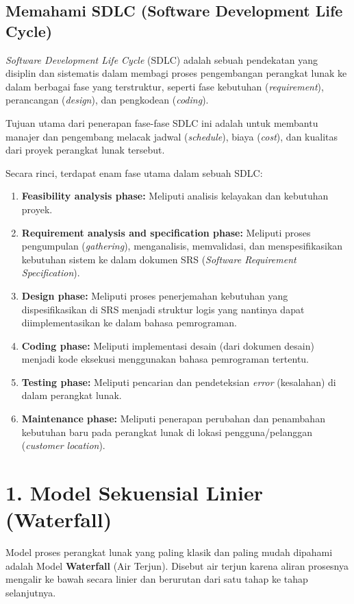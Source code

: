 \documentclass[12pt,a4paper]{article}
\begin{document}
\subsection{Memahami SDLC (Software Development Life Cycle)}
\textit{Software Development Life Cycle} (SDLC) adalah sebuah pendekatan yang disiplin dan sistematis dalam membagi proses pengembangan perangkat lunak ke dalam berbagai fase yang terstruktur, seperti fase kebutuhan (\textit{requirement}), perancangan (\textit{design}), dan pengkodean (\textit{coding}). 

Tujuan utama dari penerapan fase-fase SDLC ini adalah untuk membantu manajer dan pengembang melacak jadwal (\textit{schedule}), biaya (\textit{cost}), dan kualitas dari proyek perangkat lunak tersebut.

Secara rinci, terdapat enam fase utama dalam sebuah SDLC:
\begin{enumerate}
    \item \textbf{Feasibility analysis phase:} Meliputi analisis kelayakan dan kebutuhan proyek.
    \item \textbf{Requirement analysis and specification phase:} Meliputi proses pengumpulan (\textit{gathering}), menganalisis, memvalidasi, dan menspesifikasikan kebutuhan sistem ke dalam dokumen SRS (\textit{Software Requirement Specification}).
    \item \textbf{Design phase:} Meliputi proses penerjemahan kebutuhan yang dispesifikasikan di SRS menjadi struktur logis yang nantinya dapat diimplementasikan ke dalam bahasa pemrograman.
    \item \textbf{Coding phase:} Meliputi implementasi desain (dari dokumen desain) menjadi kode eksekusi menggunakan bahasa pemrograman tertentu.
    \item \textbf{Testing phase:} Meliputi pencarian dan pendeteksian \textit{error} (kesalahan) di dalam perangkat lunak.
    \item \textbf{Maintenance phase:} Meliputi penerapan perubahan dan penambahan kebutuhan baru pada perangkat lunak di lokasi pengguna/pelanggan (\textit{customer location}).
\end{enumerate}

\newpage
\section{1. Model Sekuensial Linier (Waterfall)}

Model proses perangkat lunak yang paling klasik dan paling mudah dipahami adalah Model \textbf{Waterfall} (Air Terjun). Disebut air terjun karena aliran prosesnya mengalir ke bawah secara linier dan berurutan dari satu tahap ke tahap selanjutnya.
\end{document}
